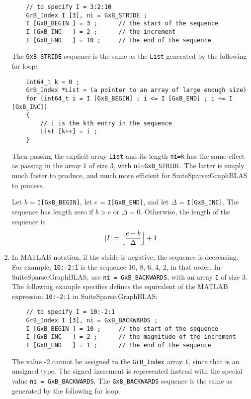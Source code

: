\documentclass[12pt]{article}
\begin{document}
\begin{enumerate}
    {\footnotesize
    \begin{verbatim}
    // to specify I = 3:2:10
    GrB_Index I [3], ni = GxB_STRIDE ;
    I [GxB_BEGIN ] = 3 ;      // the start of the sequence
    I [GxB_INC   ] = 2 ;      // the increment
    I [GxB_END   ] = 10 ;     // the end of the sequence \end{verbatim}}

    The \verb'GxB_STRIDE' sequence is the same as the \verb'List' generated by
    the following for loop:

    {\footnotesize
    \begin{verbatim}
    int64_t k = 0 ;
    GrB_Index *List = (a pointer to an array of large enough size)
    for (int64_t i = I [GxB_BEGIN] ; i <= I [GxB_END] ; i += I [GxB_INC])
    {
        // i is the kth entry in the sequence
        List [k++] = i ;
    } \end{verbatim}}

    Then passing the explicit array \verb'List' and its length \verb'ni=k' has
    the same effect as passing in the array \verb'I' of size 3, with
    \verb'ni=GxB_STRIDE'.  The latter is simply much faster to produce, and
    much more efficient for SuiteSparse:GraphBLAS to process.

    Let $b$ = \verb'I[GxB_BEGIN]', let $e$ = \verb'I[GxB_END]', and let
    $\Delta$ = \verb'I[GxB_INC]'.  The sequence has length zero if $b > e$ or
    $\Delta=0$.  Otherwise, the length of the sequence is
    \[
    |I| = \Bigl\lfloor\dfrac{e-b}{\Delta}\Bigr\rfloor + 1
    \]

\item
    In MATLAB notation, if the stride is negative, the sequence is decreasing.
    For example, \verb'10:-2:1' is the sequence 10, 8, 6, 4, 2, in that order.
    In SuiteSparse:GraphBLAS, use \verb'ni = GxB_BACKWARDS', with an array
    \verb'I' of size 3.  The following example specifies defines the equivalent
    of the MATLAB expression \verb'10:-2:1' in SuiteSparse:GraphBLAS:

    \vspace{-0.1in}
    {\footnotesize
    \begin{verbatim}
    // to specify I = 10:-2:1
    GrB_Index I [3], ni = GxB_BACKWARDS ;
    I [GxB_BEGIN ] = 10 ;     // the start of the sequence
    I [GxB_INC   ] = 2 ;      // the magnitude of the increment
    I [GxB_END   ] = 1 ;      // the end of the sequence \end{verbatim}}

    \vspace{-0.1in}
    The value -2 cannot be assigned to the \verb'GrB_Index' array \verb'I',
    since that is an unsigned type.  The signed increment is represented
    instead with the special value \verb'ni = GxB_BACKWARDS'.
    The \verb'GxB_BACKWARDS' sequence is the same as generated by the following
    for loop:


\end{enumerate}
\end{document}
